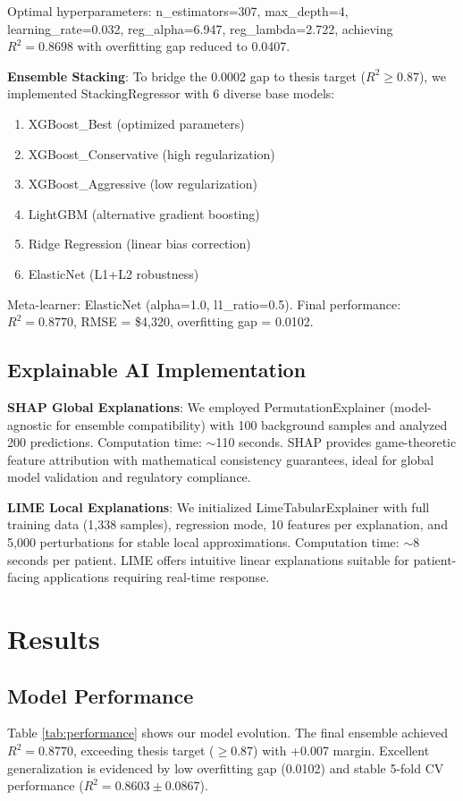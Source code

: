 \documentclass[conference]{IEEEtran}
\begin{document}
Optimal hyperparameters: n\_estimators=307, max\_depth=4, learning\_rate=0.032, reg\_alpha=6.947, reg\_lambda=2.722, achieving $R^2 = 0.8698$ with overfitting gap reduced to 0.0407.

\textbf{Ensemble Stacking}: To bridge the 0.0002 gap to thesis target ($R^2 \geq 0.87$), we implemented StackingRegressor with 6 diverse base models:
\begin{enumerate}
\item XGBoost\_Best (optimized parameters)
\item XGBoost\_Conservative (high regularization)
\item XGBoost\_Aggressive (low regularization)
\item LightGBM (alternative gradient boosting)
\item Ridge Regression (linear bias correction)
\item ElasticNet (L1+L2 robustness)
\end{enumerate}

Meta-learner: ElasticNet (alpha=1.0, l1\_ratio=0.5). Final performance: $R^2 = 0.8770$, RMSE = \$4,320, overfitting gap = 0.0102.

\subsection{Explainable AI Implementation}

\textbf{SHAP Global Explanations}: We employed PermutationExplainer (model-agnostic for ensemble compatibility) with 100 background samples and analyzed 200 predictions. Computation time: $\sim$110 seconds. SHAP provides game-theoretic feature attribution with mathematical consistency guarantees, ideal for global model validation and regulatory compliance.

\textbf{LIME Local Explanations}: We initialized LimeTabularExplainer with full training data (1,338 samples), regression mode, 10 features per explanation, and 5,000 perturbations for stable local approximations. Computation time: $\sim$8 seconds per patient. LIME offers intuitive linear explanations suitable for patient-facing applications requiring real-time response.

\section{Results}

\subsection{Model Performance}
Table \ref{tab:performance} shows our model evolution. The final ensemble achieved $R^2 = 0.8770$, exceeding thesis target ($\geq$0.87) with +0.007 margin. Excellent generalization is evidenced by low overfitting gap (0.0102) and stable 5-fold CV performance ($R^2 = 0.8603 \pm 0.0867$).
\end{document}
